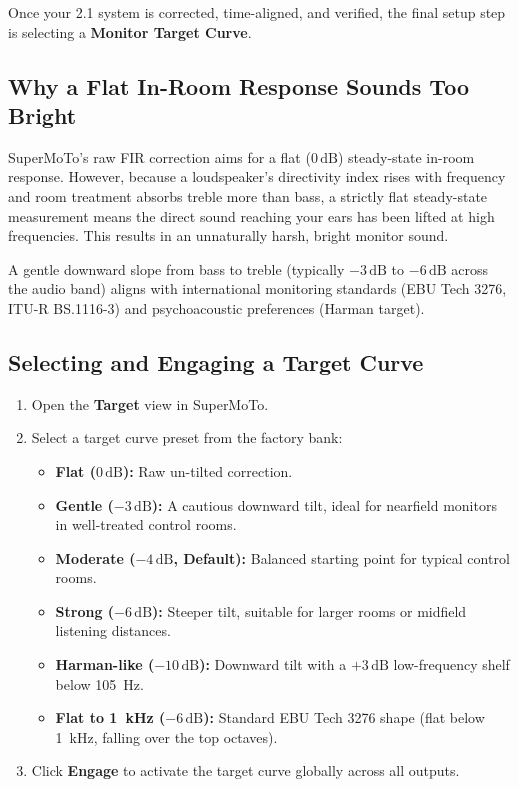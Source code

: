 \documentclass[11pt,a4paper]{article}
\begin{document}
Once your 2.1 system is corrected, time-aligned, and verified, the final setup step is selecting a \textbf{Monitor Target Curve}.

\subsection{Why a Flat In-Room Response Sounds Too Bright}
SuperMoTo's raw FIR correction aims for a flat ($0\,\mathrm{dB}$) steady-state in-room response. However, because a loudspeaker's directivity index rises with frequency and room treatment absorbs treble more than bass, a strictly flat steady-state measurement means the direct sound reaching your ears has been lifted at high frequencies. This results in an unnaturally harsh, bright monitor sound.

A gentle downward slope from bass to treble (typically $-3\,\mathrm{dB}$ to $-6\,\mathrm{dB}$ across the audio band) aligns with international monitoring standards (EBU Tech 3276, ITU-R BS.1116-3) and psychoacoustic preferences (Harman target).

\subsection{Selecting and Engaging a Target Curve}
\begin{enumerate}
  \item Open the \textbf{Target} view in SuperMoTo.
  \item Select a target curve preset from the factory bank:
    \begin{itemize}[nosep]
      \item \textbf{Flat ($0\,\mathrm{dB}$):} Raw un-tilted correction.
      \item \textbf{Gentle ($-3\,\mathrm{dB}$):} A cautious downward tilt, ideal for nearfield monitors in well-treated control rooms.
      \item \textbf{Moderate ($-4\,\mathrm{dB}$, Default):} Balanced starting point for typical control rooms.
      \item \textbf{Strong ($-6\,\mathrm{dB}$):} Steeper tilt, suitable for larger rooms or midfield listening distances.
      \item \textbf{Harman-like ($-10\,\mathrm{dB}$):} Downward tilt with a $+3\,\mathrm{dB}$ low-frequency shelf below \SI{105}{\hertz}.
      \item \textbf{Flat to \SI{1}{\kilo\hertz} ($-6\,\mathrm{dB}$):} Standard EBU Tech 3276 shape (flat below \SI{1}{\kilo\hertz}, falling over the top octaves).
    \end{itemize}
  \item Click \textbf{Engage} to activate the target curve globally across all outputs.
\end{enumerate}
\end{document}
